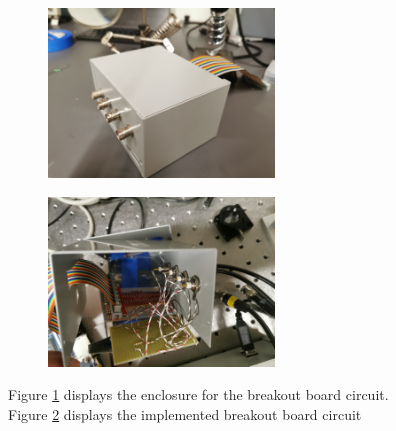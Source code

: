 \documentclass[letterpaper, 11 pt]{article}
\begin{document}
\begin{figure}[H]%
    \centering
    \begin{subfigure}{.4\textwidth}
    \includegraphics[width=6cm]{BB_box.jpg}
    \caption{ }
    \label{fig:box}
    \end{subfigure}
    \begin{subfigure}{.4\textwidth}
    \includegraphics[width = 6cm]{BB_electronics.jpg}
    \caption{ }
    \label{fig:circ}
    \end{subfigure}
    \caption{Figure \ref{fig:box} displays the enclosure for the breakout board circuit.
    Figure \ref{fig:circ} displays the implemented breakout board circuit}
    \label{fig:bb}
\end{figure}
\end{document}
